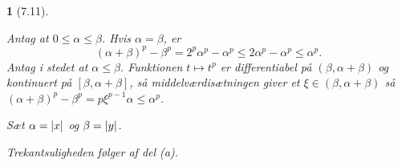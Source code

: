 \documentclass[a4paper, 11pt, article, danish, oneside]{memoir}
\newcommand{\blank}{\mathrel{\;\cdot\;}}
\newcommand{\blankifempty}[1]{\ifstrempty{#1}{\blank}{#1}}
\DeclarePairedDelimiter{\auxdelimlvert}{\lvert}{\rvert}
\newcommand{\abs}[2][]{\auxdelimlvert[#1]{\blankifempty{#2}}}
\newcommand{\pencilsymbol}{\raisebox{-2pt}{\normalfont\PencilLeft}}
\theoremstyle{changedotcustomnumber}
\theoremstyle{changedotbreakcustomnumber}
\newtheorem{opgavebreak}{\pencilsymbol}
\begin{document}
\begin{opgavebreak}[7.11]
\begin{solutionsec}
    \item Antag at $0 \leq \alpha \leq \beta$. Hvis $\alpha = \beta$, er
    \begin{equation*}
        (\alpha + \beta)^p - \beta^p
            = 2^p \alpha^p - \alpha^p
            \leq 2 \alpha^p - \alpha^p
            \leq \alpha^p.
    \end{equation*}
    Antag i stedet at $\alpha \leq \beta$. Funktionen $t \mapsto t^p$ er differentiabel på $(\beta, \alpha+\beta)$ og kontinuert på $[\beta, \alpha+\beta]$, så middelværdisætningen giver et $\xi \in (\beta, \alpha+\beta)$ så $(\alpha+\beta)^p - \beta^p = p\xi^{p-1} \alpha \leq \alpha^p$.

    Sæt $\alpha = \abs{x}$ og $\beta = \abs{y}$.

    \item Trekantsuligheden følger af del (a).
\end{solutionsec}
\end{opgavebreak}
\end{document}
